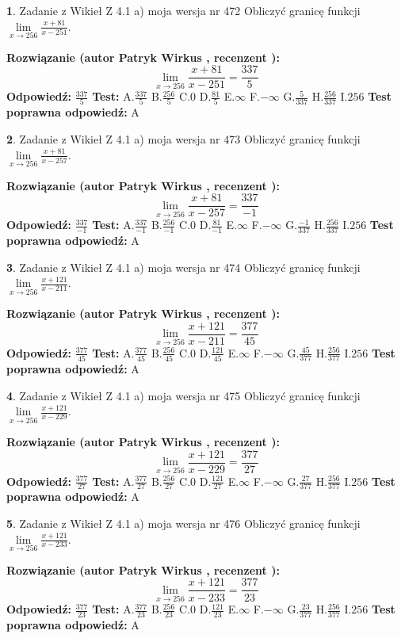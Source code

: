 \documentclass[12pt, a4paper]{article}
\theoremstyle{definition} %
\newtheorem{zad}{}
\newcommand{\zadStart}[1]{\begin{zad}#1\newline}
\newcommand{\zadStop}{\end{zad}}
\newcommand{\rozwStart}[2]{\noindent \textbf{Rozwiązanie (autor #1 , recenzent #2): }\newline}
\newcommand{\rozwStop}{\newline}
\newcommand{\odpStart}{\noindent \textbf{Odpowiedź:}\newline}
\newcommand{\odpStop}{\newline}
\newcommand{\testStart}{\noindent \textbf{Test:}\newline}
\newcommand{\testStop}{\newline}
\newcommand{\kluczStart}{\noindent \textbf{Test poprawna odpowiedź:}\newline}
\newcommand{\kluczStop}{\newline}
\begin{document}
\zadStart{Zadanie z Wikieł Z 4.1 a) moja wersja nr 472}
Obliczyć granicę funkcji $\lim\limits_{x\to256}\frac{x+81}{x-251}$.
\zadStop
\rozwStart{Patryk Wirkus}{}
$$\lim\limits_{x\to256}\frac{x+81}{x-251} = \frac{337}{5}$$
\rozwStop
\odpStart
$\frac{337}{5}$
\odpStop
\testStart
A.$\frac{337}{5}$
B.$\frac{256}{5}$
C.$0$
D.$\frac{81}{5}$
E.$\infty$
F.$-\infty$
G.$\frac{5}{337}$
H.$\frac{256}{337}$
I.$256$
\testStop
\kluczStart
A
\kluczStop



\zadStart{Zadanie z Wikieł Z 4.1 a) moja wersja nr 473}
Obliczyć granicę funkcji $\lim\limits_{x\to256}\frac{x+81}{x-257}$.
\zadStop
\rozwStart{Patryk Wirkus}{}
$$\lim\limits_{x\to256}\frac{x+81}{x-257} = \frac{337}{-1}$$
\rozwStop
\odpStart
$\frac{337}{-1}$
\odpStop
\testStart
A.$\frac{337}{-1}$
B.$\frac{256}{-1}$
C.$0$
D.$\frac{81}{-1}$
E.$\infty$
F.$-\infty$
G.$\frac{-1}{337}$
H.$\frac{256}{337}$
I.$256$
\testStop
\kluczStart
A
\kluczStop



\zadStart{Zadanie z Wikieł Z 4.1 a) moja wersja nr 474}
Obliczyć granicę funkcji $\lim\limits_{x\to256}\frac{x+121}{x-211}$.
\zadStop
\rozwStart{Patryk Wirkus}{}
$$\lim\limits_{x\to256}\frac{x+121}{x-211} = \frac{377}{45}$$
\rozwStop
\odpStart
$\frac{377}{45}$
\odpStop
\testStart
A.$\frac{377}{45}$
B.$\frac{256}{45}$
C.$0$
D.$\frac{121}{45}$
E.$\infty$
F.$-\infty$
G.$\frac{45}{377}$
H.$\frac{256}{377}$
I.$256$
\testStop
\kluczStart
A
\kluczStop



\zadStart{Zadanie z Wikieł Z 4.1 a) moja wersja nr 475}
Obliczyć granicę funkcji $\lim\limits_{x\to256}\frac{x+121}{x-229}$.
\zadStop
\rozwStart{Patryk Wirkus}{}
$$\lim\limits_{x\to256}\frac{x+121}{x-229} = \frac{377}{27}$$
\rozwStop
\odpStart
$\frac{377}{27}$
\odpStop
\testStart
A.$\frac{377}{27}$
B.$\frac{256}{27}$
C.$0$
D.$\frac{121}{27}$
E.$\infty$
F.$-\infty$
G.$\frac{27}{377}$
H.$\frac{256}{377}$
I.$256$
\testStop
\kluczStart
A
\kluczStop



\zadStart{Zadanie z Wikieł Z 4.1 a) moja wersja nr 476}
Obliczyć granicę funkcji $\lim\limits_{x\to256}\frac{x+121}{x-233}$.
\zadStop
\rozwStart{Patryk Wirkus}{}
$$\lim\limits_{x\to256}\frac{x+121}{x-233} = \frac{377}{23}$$
\rozwStop
\odpStart
$\frac{377}{23}$
\odpStop
\testStart
A.$\frac{377}{23}$
B.$\frac{256}{23}$
C.$0$
D.$\frac{121}{23}$
E.$\infty$
F.$-\infty$
G.$\frac{23}{377}$
H.$\frac{256}{377}$
I.$256$
\testStop
\kluczStart
A
\kluczStop
\end{document}
